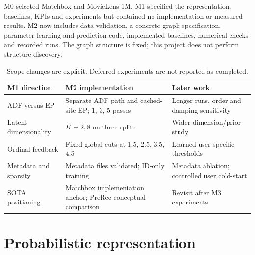 \documentclass[11pt,a4paper]{article}
\begin{document}
M0 selected Matchbox and MovieLens 1M. M1 specified the representation, baselines,
KPIs and experiments but contained no implementation or measured results. M2
now includes data validation, a concrete graph specification, parameter-learning
and prediction code, implemented baselines, numerical checks and recorded runs.
The graph structure is fixed; this project does not perform structure discovery.

\begin{table}[htbp]\centering\small
\begin{tabularx}{\linewidth}{@{}lXX@{}}\toprule
M1 direction & M2 implementation & Later work\\\midrule
ADF versus EP & Separate ADF path and cached-site EP; 1, 3, 5 passes & Longer runs, order and damping sensitivity\\
Latent dimensionality & $K=2,8$ on three splits & Wider dimension/prior study\\
Ordinal feedback & Fixed global cuts at 1.5, 2.5, 3.5, 4.5 & Learned user-specific thresholds\\
Metadata and sparsity & Metadata files validated; ID-only training & Metadata ablation; controlled user cold-start\\
SOTA positioning & Matchbox implementation anchor; PreRec conceptual comparison & Revisit after M3 experiments\\\bottomrule
\end{tabularx}
\caption{Scope changes are explicit. Deferred experiments are not reported as completed.}
\end{table}

\section{Probabilistic representation}
\end{document}
